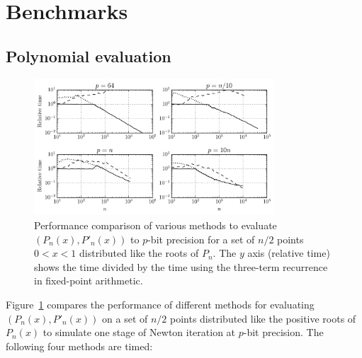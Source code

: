 \documentclass{siamart0216}
\begin{document}
\section{Benchmarks}

\label{sec:bench}

\subsection{Polynomial evaluation}

\begin{figure}[h!]
\begin{centering}
\includegraphics[width=0.8\textwidth]{benchplot}
\caption{Performance comparison of various methods to evaluate $(P_n(x), P'_n(x))$ to $p$-bit precision for a
set of $n / 2$ points $0 < x < 1$ distributed like the roots of $P_n$.
The $y$ axis (relative time) shows the time divided by the time
using the three-term recurrence in fixed-point arithmetic.}
\label{fig:benchplot}
\end{centering}
\end{figure}

Figure~\ref{fig:benchplot} compares the performance of different methods
for evaluating $(P_n(x), P'_n(x))$ on a set of $n/2$ points
distributed like the positive roots of $P_n(x)$
to simulate one stage of Newton iteration at $p$-bit precision.
The following four methods are timed:
\end{document}
